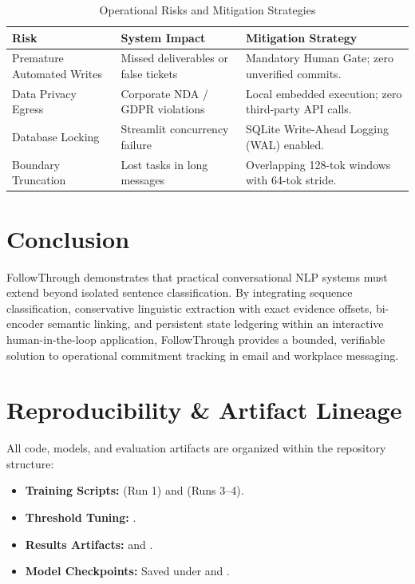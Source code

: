 \documentclass[conference]{IEEEtran}
\begin{document}
\begin{table}[htbp]
\caption{Operational Risks and Mitigation Strategies}
\begin{center}
\begin{tabular}{p{2.2cm}p{2.6cm}p{2.8cm}}
\toprule
\textbf{Risk} & \textbf{System Impact} & \textbf{Mitigation Strategy} \\
\midrule
Premature Automated Writes & Missed deliverables or false tickets & Mandatory Human Gate; zero unverified commits. \\
Data Privacy Egress & Corporate NDA / GDPR violations & Local embedded execution; zero third-party API calls. \\
Database Locking & Streamlit concurrency failure & SQLite Write-Ahead Logging (WAL) enabled. \\
Boundary Truncation & Lost tasks in long messages & Overlapping 128-tok windows with 64-tok stride. \\
\bottomrule
\end{tabular}
\label{tab:risks}
\end{center}
\end{table}

\section{Conclusion}
FollowThrough demonstrates that practical conversational NLP systems must extend beyond isolated sentence classification. By integrating sequence classification, conservative linguistic extraction with exact evidence offsets, bi-encoder semantic linking, and persistent state ledgering within an interactive human-in-the-loop application, FollowThrough provides a bounded, verifiable solution to operational commitment tracking in email and workplace messaging.

\section*{Reproducibility \& Artifact Lineage}
All code, models, and evaluation artifacts are organized within the repository structure:
\begin{itemize}
    \item \textbf{Training Scripts:}  (Run 1) and  (Runs 3--4).
    \item \textbf{Threshold Tuning:} .
    \item \textbf{Results Artifacts:}  and .
    \item \textbf{Model Checkpoints:} Saved under  and .
\end{itemize}
\end{document}
